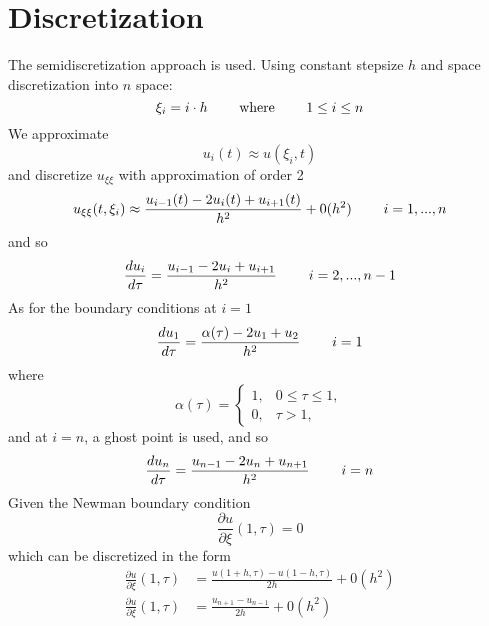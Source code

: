 \documentclass{article}
\begin{document}
\section{Discretization}

The semidiscretization approach is used. Using constant stepsize $h$ and space discretization into $n$ space:
\begin{equation*}
    \xi_i = i \cdot h \hspace{0.8cm} \text{where}  \hspace{0.8cm} 1 \leq i \leq n 
\end{equation*}
We approximate
\begin{equation*}
    u_i(t) \approx u(\xi_i,t)
\end{equation*}
and discretize $u_{\xi \xi}$ with approximation of order 2
\begin{equation*}
    u_{\xi \xi}(t,\xi_i) \approx \frac{u_{i-1}(t) - 2u_i(t) + u_{i+1}(t)}{h^2} + 0(h^2) \hspace{0.8cm} i = 1, ..., n
\end{equation*}
and so
\begin{equation*}
    \frac{d u_i}{d\tau} = \frac{u_{i-1} - 2u_i + u_{i+1}}{h^2}  \hspace{0.8cm} i = 2, ..., n-1
\end{equation*}
As for the boundary conditions at $i = 1$
\begin{equation*}
    \frac{d u_1}{d\tau} = \frac{\alpha(\tau) - 2u_1 + u_{2}}{h^2}  \hspace{0.8cm} i = 1
\end{equation*}
where 
\begin{equation*} 
  \alpha(\tau)= 
\begin{cases}
    1,           & 0 \leq \tau \leq 1, \\
    0,              & \tau > 1,
\end{cases}
\end{equation*}
and at $i = n$, a ghost point is used, and so
\begin{equation*}
    \frac{d u_n}{d\tau} = \frac{u_{n-1} - 2u_n + u_{n+1}}{h^2}  \hspace{0.8cm} i = n
\end{equation*}
Given the Newman boundary condition
\begin{equation*}
    \frac{\partial u}{\partial \xi} (1,\tau) = 0
\end{equation*}
which can be discretized in the form
\begin{equation*}
\begin{split}
        \frac{\partial u}{\partial \xi} (1,\tau) &= \frac{u(1+h,\tau)-u(1-h,\tau)}{2h} + 0(h^2)\\
         \frac{\partial u}{\partial \xi} (1,\tau) &= \frac{u_{n+1}-u_{n-1}}{2h} + 0(h^2)
\end{split}
\end{equation*}
\end{document}
